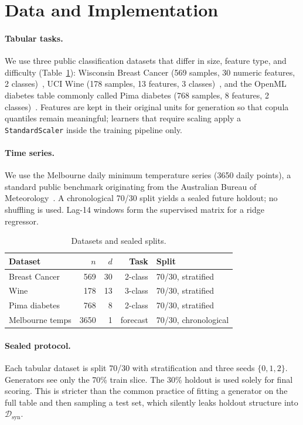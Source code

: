 \documentclass[conference]{IEEEtran}
\begin{document}
\section{Data and Implementation}
\label{sec:setup}
\paragraph{Tabular tasks.}
We use three public classification datasets that differ in size, feature type, and difficulty (Table~\ref{tab:data}): Wisconsin Breast Cancer (569 samples, 30 numeric features, 2 classes)~\cite{wolberg1995wdbc}, UCI Wine (178 samples, 13 features, 3 classes)~\cite{aeberhard1991wine}, and the OpenML diabetes table commonly called Pima diabetes (768 samples, 8 features, 2 classes)~\cite{smith1988adap}.
Features are kept in their original units for generation so that copula quantiles remain meaningful; learners that require scaling apply a \texttt{StandardScaler} inside the training pipeline only.

\paragraph{Time series.}
We use the Melbourne daily minimum temperature series (3650 daily points), a standard public benchmark originating from the Australian Bureau of Meteorology~\cite{bommelbourne}.
A chronological 70/30 split yields a sealed future holdout; no shuffling is used.
Lag-14 windows form the supervised matrix for a ridge regressor.

\begin{table}[t]
\centering
\caption{Datasets and sealed splits.}
\label{tab:data}
\begin{tabular}{lrrrl}
\toprule
Dataset & $n$ & $d$ & Task & Split \\
\midrule
Breast Cancer & 569 & 30 & 2-class & 70/30, stratified \\
Wine & 178 & 13 & 3-class & 70/30, stratified \\
Pima diabetes & 768 & 8 & 2-class & 70/30, stratified \\
Melbourne temps & 3650 & 1 & forecast & 70/30, chronological \\
\bottomrule
\end{tabular}
\end{table}

\paragraph{Sealed protocol.}
Each tabular dataset is split 70/30 with stratification and three seeds $\{0,1,2\}$.
Generators see only the 70\% train slice.
The 30\% holdout is used solely for final scoring.
This is stricter than the common practice of fitting a generator on the full table and then sampling a test set, which silently leaks holdout structure into $\mathcal{D}_{\mathrm{syn}}$.
\end{document}
